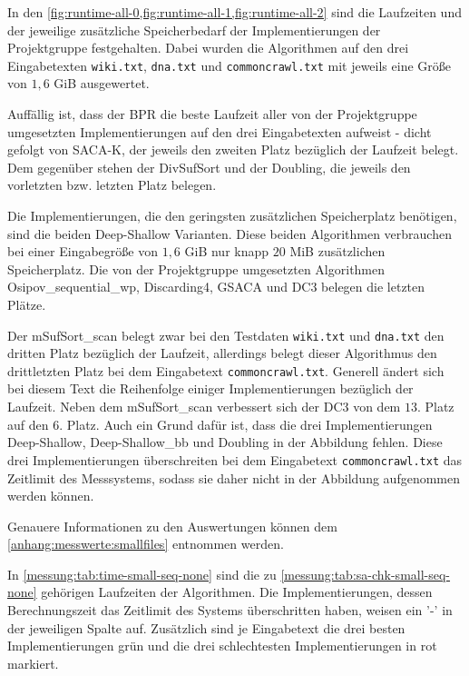 %
%

In den \cref{fig:runtime-all-0,fig:runtime-all-1,fig:runtime-all-2} sind die Laufzeiten und der jeweilige zusätzliche Speicherbedarf der Implementierungen der Projektgruppe festgehalten. Dabei wurden die Algorithmen auf den drei Eingabetexten \texttt{wiki.txt}, \texttt{dna.txt} und \texttt{commoncrawl.txt} mit jeweils eine Größe von $1,6$ GiB ausgewertet.

Auffällig ist, dass der BPR die beste Laufzeit aller von der Projektgruppe umgesetzten Implementierungen auf den drei Eingabetexten aufweist - dicht gefolgt von SACA-K, der jeweils den zweiten Platz bezüglich der Laufzeit belegt. Dem gegenüber stehen der DivSufSort und der Doubling, die jeweils den vorletzten bzw. letzten Platz belegen.

Die Implementierungen, die den geringsten zusätzlichen Speicherplatz benötigen, sind die beiden Deep-Shallow Varianten. Diese beiden Algorithmen verbrauchen bei einer Eingabegröße von $1,6$ GiB nur knapp $20$ MiB zusätzlichen Speicherplatz. Die von der Projektgruppe umgesetzten Algorithmen Osipov\_sequential\_wp, Discarding4, GSACA und DC3 belegen die letzten Plätze.

Der mSufSort\_scan belegt zwar bei den Testdaten \texttt{wiki.txt} und \texttt{dna.txt} den dritten Platz bezüglich der Laufzeit, allerdings belegt dieser Algorithmus den drittletzten Platz bei dem Eingabetext \texttt{commoncrawl.txt}. Generell ändert sich bei diesem Text die Reihenfolge einiger Implementierungen bezüglich der Laufzeit. Neben dem mSufSort\_scan verbessert sich der DC3 von dem $13$. Platz auf den $6$. Platz. Auch ein Grund dafür ist, dass die drei Implementierungen Deep-Shallow, Deep-Shallow\_bb und Doubling in der Abbildung fehlen. Diese drei Implementierungen überschreiten bei dem Eingabetext \texttt{commoncrawl.txt} das Zeitlimit des Messsystems, sodass sie daher nicht in der Abbildung aufgenommen werden können.

Genauere Informationen zu den Auswertungen können dem \cref{anhang:messwerte:smallfiles} entnommen werden.

In \cref{messung:tab:time-small-seq-none} sind die zu \cref{messung:tab:sa-chk-small-seq-none} gehörigen Laufzeiten der Algorithmen. Die Implementierungen, dessen Berechnungszeit das Zeitlimit des Systems überschritten haben, weisen ein '-' in der jeweiligen Spalte auf. Zusätzlich sind je Eingabetext die drei besten Implementierungen grün und die drei schlechtesten Implementierungen in rot markiert.

